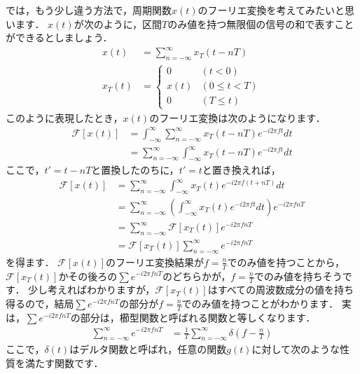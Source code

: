 では，もう少し違う方法で，周期関数$x(t)$のフーリエ変換を考えてみたいと思います．
$x(t)$が次のように，区間$T$のみ値を持つ無限個の信号の和で表すことができるとしましょう．
\begin{align}
x(t) &= \sum_{n=-\infty}^{\infty} x_T(t - nT) \\
x_T(t) &=   \begin{cases}
                0    & (t < 0) \\
                x(t) & (0 \leq t < T) \\
                0    & (T \leq t)
            \end{cases}
\end{align}
このように表現したとき，$x(t)$のフーリエ変換は次のようになります．
\begin{align}
\mathcal{F}[x(t)]   &= \int_{-\infty}^{\infty} \sum_{n=-\infty}^{\infty} x_T(t - nT) e^{-i2\pi f t} dt \nonumber\\
                    &= \sum_{n=-\infty}^{\infty} \int_{-\infty}^{\infty} x_T(t - nT) e^{-i2\pi f t} dt
\end{align}
ここで，$t'=t-nT$と置換したのちに，$t'=t$と置き換えれば，
\begin{align}
\mathcal{F}[x(t)]   &= \sum_{n=-\infty}^{\infty} \int_{-\infty}^{\infty} x_T(t) e^{-i2\pi f (t+nT)} dt \nonumber\\
                    &= \sum_{n=-\infty}^{\infty} \left( \int_{-\infty}^{\infty} x_T(t) e^{-i2\pi f t} dt \right) e^{-i2 \pi f nT} \nonumber\\
                    &= \sum_{n=-\infty}^{\infty} \mathcal{F}[x_T(t)] e^{-i2 \pi f nT} \nonumber\\
                    &= \mathcal{F}[x_T(t)] \sum_{n=-\infty}^{\infty}  e^{-i2 \pi f nT}
\end{align}
を得ます．
$\mathcal{F}[x(t)]$のフーリエ変換結果が$f=\frac{n}{T}$でのみ値を持つことから，$\mathcal{F}[x_T(t)]$かその後ろの$\sum e^{-i2 \pi f nT}$のどちらかが，$f=\frac{n}{T}$でのみ値を持ちそうです．
少し考えればわかりますが，$\mathcal{F}[x_T(t)]$はすべての周波数成分の値を持ち得るので，結局$\sum e^{-i2 \pi f nT}$の部分が$f=\frac{n}{T}$でのみ値を持つことがわかります．
実は，$\sum e^{-i2 \pi f nT}$の部分は，櫛型関数と呼ばれる関数と等しくなります．
\begin{align}
\sum_{n=-\infty}^{\infty}  e^{-i2 \pi f nT} &= \frac{1}{T} \sum_{n=-\infty}^{\infty} \delta\left(f - \frac{n}{T}\right) \label{eq:comb_function}
\end{align}
ここで，$\delta(t)$はデルタ関数と呼ばれ，任意の関数$g(t)$に対して次のような性質を満たす関数です．
